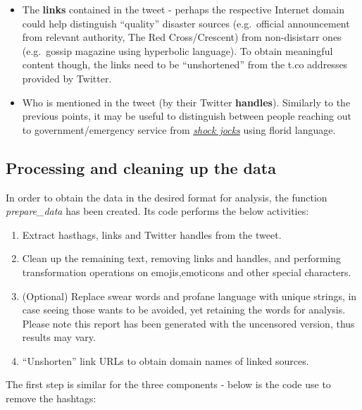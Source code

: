 \documentclass[11pt,]{article}
\providecommand{\tightlist}{%
  \setlength{\itemsep}{0pt}\setlength{\parskip}{0pt}}
\begin{document}
\begin{itemize}
\tightlist
\item
  The \textbf{links} contained in the tweet - perhaps the respective
  Internet domain could help distinguish ``quality'' disaster sources
  (e.g.~official announcement from relevant authority, The Red
  Cross/Crescent) from non-disistarr ones (e.g.~gossip magazine using
  hyperbolic language). To obtain meaningful content though, the links
  need to be ``unshortened'' from the t.co addresses provided by
  Twitter.
\item
  Who is mentioned in the tweet (by their Twitter \textbf{handles}).
  Similarly to the previous points, it may be useful to distinguish
  between people reaching out to government/emergency service from
  \emph{\href{https://en.wikipedia.org/wiki/Shock_jock}{shock jocks}}
  using florid language.
\end{itemize}

\hypertarget{processing-and-cleaning-up-the-data}{%
\subsection{Processing and cleaning up the
data}\label{processing-and-cleaning-up-the-data}}

In order to obtain the data in the desired format for analysis, the
function \emph{prepare\_data} has been created. Its code performs the
below activities:

\begin{enumerate}
\def\labelenumi{\arabic{enumi}.}
\tightlist
\item
  Extract hasthags, links and Twitter handles from the tweet.
\item
  Clean up the remaining text, removing links and handles, and
  performing transformation operations on emojis,emoticons and other
  special characters.
\item
  (Optional) Replace swear words and profane language with unique
  strings, in case seeing those wants to be avoided, yet retaining the
  words for analysis. Please note this report has been generated with
  the uncensored version, thus results may vary.
\item
  ``Unshorten'' link URLs to obtain domain names of linked sources.
\end{enumerate}

The first step is similar for the three components - below is the code
use to remove the hashtags:
\end{document}
